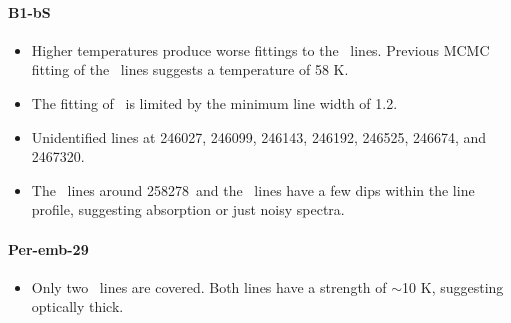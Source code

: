 \paragraph{B1-bS}
\begin{itemize}
  \item Higher temperatures produce worse fittings to the \methylformate\ lines.  Previous MCMC fitting of the \methylformate\ lines suggests a temperature of 58 K.
  \item The fitting of \dimethylether\ is limited by the minimum line width of 1.2\kms.  
  \item Unidentified lines at 246027\mhz, 246099\mhz, 246143\mhz, 246192\mhz, 246525\mhz, 246674\mhz, and 2467320\mhz.
  \item The \methylformate\ lines around 258278\mhz\ and the \htcn\ lines have a few dips within the line profile, suggesting absorption or just noisy spectra.
\end{itemize}

\paragraph{Per-emb-29}
\begin{itemize}
  \item Only two \methanol\ lines are covered.  Both lines have a strength of $\sim$10 K, suggesting optically thick.
\end{itemize}

